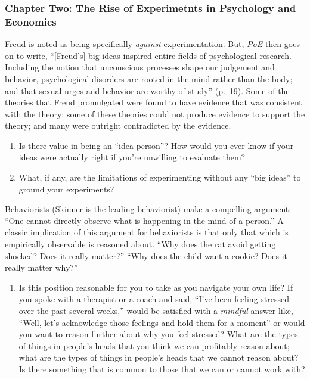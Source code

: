 \documentclass[
]{article}
\providecommand{\tightlist}{%
  \setlength{\itemsep}{0pt}\setlength{\parskip}{0pt}}
\begin{document}
\hypertarget{chapter-two-the-rise-of-experimetnts-in-psychology-and-economics}{%
\subsubsection{Chapter Two: The Rise of Experimetnts in Psychology and Economics}\label{chapter-two-the-rise-of-experimetnts-in-psychology-and-economics}}

Freud is noted as being specifically \emph{against} experimentation. But, \emph{PoE} then goes on to write, ``{[}Freud's{]} big ideas inspired entire fields of psychological research. Including the notion that unconscious processes shape our judgement and behavior, psychological disorders are rooted in the mind rather than the body; and that sexual urges and behavior are worthy of study'' (p.~19). Some of the theories that Freud promulgated were found to have evidence that was consistent with the theory; some of these theories could not produce evidence to support the theory; and many were outright contradicted by the evidence.

\begin{enumerate}
\def\labelenumi{\arabic{enumi}.}
\tightlist
\item
  Is there value in being an ``idea person''? How would you ever know if your ideas were actually right if you're unwilling to evaluate them?
\item
  What, if any, are the limitations of experimenting without any ``big ideas'' to ground your experiments?
\end{enumerate}

Behaviorists (Skinner is the leading behaviorist) make a compelling argument: ``One cannot directly observe what is happening in the mind of a person.'' A classic implication of this argument for behaviorists is that only that which is empirically observable is reasoned about. ``Why does the rat avoid getting shocked? Does it really matter?'' ``Why does the child want a cookie? Does it really matter why?''

\begin{enumerate}
\def\labelenumi{\arabic{enumi}.}
\tightlist
\item
  Is this position reasonable for you to take as you navigate your own life? If you spoke with a therapist or a coach and said, ``I've been feeling stressed over the past several weeks,'' would be satisfied with a \emph{mindful} answer like, ``Well, let's acknowledge those feelings and hold them for a moment'' or would you want to reason further about why you feel stressed? What are the types of things in people's heads that you think we can profitably reason about; what are the types of things in people's heads that we cannot reason about? Is there something that is common to those that we can or cannot work with?
\end{enumerate}
\end{document}

